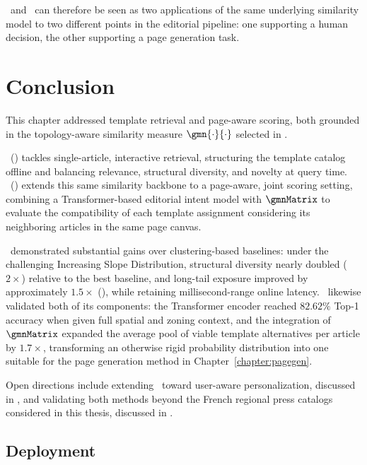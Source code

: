 \trs\ and \neuralmethod\ can therefore be seen as two applications of the same underlying similarity model to two different points in the editorial pipeline: one supporting a human decision, the other supporting a page generation task.

\section{Conclusion}

This chapter addressed template retrieval and page-aware scoring, both grounded in the topology-aware similarity measure $\gmn{\cdot}{\cdot}$ selected in . 

\trs\ () tackles single-article, interactive retrieval, structuring the template catalog offline and balancing relevance, structural diversity, and novelty at query time. \neuralmethod\ () extends this same similarity backbone to a page-aware, joint scoring setting, combining a Transformer-based editorial intent model with $\gmnMatrix$ to evaluate the compatibility of each template assignment considering its neighboring articles in the same page canvas.

\trs\ demonstrated substantial gains over clustering-based baselines: under the challenging Increasing Slope Distribution, structural diversity nearly doubled ($2\times$) relative to the best baseline, and long-tail exposure improved by approximately $1.5\times$ (), while retaining millisecond-range online latency. 
\neuralmethod\ likewise validated both of its components: the Transformer encoder reached $82.62\%$ Top-1 accuracy when given full spatial and zoning context, and the integration of $\gmnMatrix$ expanded the average pool of viable template alternatives per article by $1.7\times$, transforming an otherwise rigid probability distribution into one suitable for the page generation method in Chapter~\ref{chapter:pagegen}.

Open directions include extending \trs\ toward user-aware personalization, discussed in , and validating both methods beyond the French regional press catalogs considered in this thesis, discussed in .



\subsection*{Deployment}

